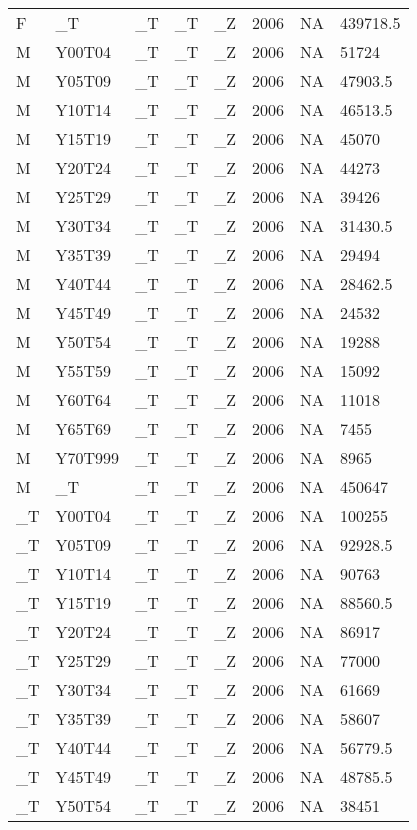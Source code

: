 \begin{longtable}[t]{llllllll}
F & \_T & \_T & \_T & \_Z & 2006 & NA & 439718.5\\
M & Y00T04 & \_T & \_T & \_Z & 2006 & NA & 51724\\
M & Y05T09 & \_T & \_T & \_Z & 2006 & NA & 47903.5\\
\addlinespace
M & Y10T14 & \_T & \_T & \_Z & 2006 & NA & 46513.5\\
M & Y15T19 & \_T & \_T & \_Z & 2006 & NA & 45070\\
M & Y20T24 & \_T & \_T & \_Z & 2006 & NA & 44273\\
M & Y25T29 & \_T & \_T & \_Z & 2006 & NA & 39426\\
M & Y30T34 & \_T & \_T & \_Z & 2006 & NA & 31430.5\\
\addlinespace
M & Y35T39 & \_T & \_T & \_Z & 2006 & NA & 29494\\
M & Y40T44 & \_T & \_T & \_Z & 2006 & NA & 28462.5\\
M & Y45T49 & \_T & \_T & \_Z & 2006 & NA & 24532\\
M & Y50T54 & \_T & \_T & \_Z & 2006 & NA & 19288\\
M & Y55T59 & \_T & \_T & \_Z & 2006 & NA & 15092\\
\addlinespace
M & Y60T64 & \_T & \_T & \_Z & 2006 & NA & 11018\\
M & Y65T69 & \_T & \_T & \_Z & 2006 & NA & 7455\\
M & Y70T999 & \_T & \_T & \_Z & 2006 & NA & 8965\\
M & \_T & \_T & \_T & \_Z & 2006 & NA & 450647\\
\_T & Y00T04 & \_T & \_T & \_Z & 2006 & NA & 100255\\
\addlinespace
\_T & Y05T09 & \_T & \_T & \_Z & 2006 & NA & 92928.5\\
\_T & Y10T14 & \_T & \_T & \_Z & 2006 & NA & 90763\\
\_T & Y15T19 & \_T & \_T & \_Z & 2006 & NA & 88560.5\\
\_T & Y20T24 & \_T & \_T & \_Z & 2006 & NA & 86917\\
\_T & Y25T29 & \_T & \_T & \_Z & 2006 & NA & 77000\\
\addlinespace
\_T & Y30T34 & \_T & \_T & \_Z & 2006 & NA & 61669\\
\_T & Y35T39 & \_T & \_T & \_Z & 2006 & NA & 58607\\
\_T & Y40T44 & \_T & \_T & \_Z & 2006 & NA & 56779.5\\
\_T & Y45T49 & \_T & \_T & \_Z & 2006 & NA & 48785.5\\
\_T & Y50T54 & \_T & \_T & \_Z & 2006 & NA & 38451\\

\end{longtable}
